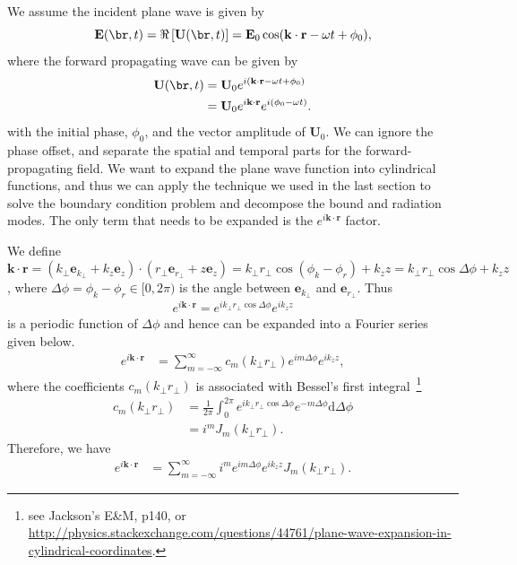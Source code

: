 \documentclass[]{report}
\begin{document}
We assume the incident plane wave is given by
\begin{equation}
\mathbf{E}(\br,t)=\Re\left[\mathbf{U}(\br,t) \right]=\mathbf{E}_0 \cos (\mathbf{k}\cdot\mathbf{r}-\omega t + \phi_0),
\end{equation}
where the forward propagating wave can be given by
\begin{align}
\mathbf{U}(\br,t) &= \mathbf{U}_0e^{i(\mathbf{k}\cdot\mathbf{r}-\omega t + \phi_0)}\\
&= \mathbf{U}_0e^{i\mathbf{k}\cdot\mathbf{r}}e^{i(\phi_0-\omega t )}.
\end{align}
with the initial phase, $\phi_0$, and the vector amplitude of $\mathbf{U}_0$. We can ignore the phase offset, and separate the spatial and temporal parts for the forward-propagating field. We want to expand the plane wave function into cylindrical functions, and thus we can apply the technique we used in the last section to solve the boundary condition problem and decompose the bound and radiation modes. The only term that needs to be expanded is the $ e^{i\mathbf{k}\cdot\mathbf{r}} $ factor. 

We define $ \mathbf{k}\cdot\mathbf{r}=(k\!_{\perp}\mathbf{e}\!_{k\!_\perp}+k_z\mathbf{e}_{z}) \cdot(r\!_{\perp}\mathbf{e}\!_{r\!_\perp}+z\mathbf{e}_{z}) = k\!_{\perp}r\!_{\perp}\cos(\phi_{k}-\phi_{r})+k_{z}{z}= k\!_\perp r\!_\perp \cos \Delta\phi +k_{z}{z}$, where $ \Delta\phi=\phi_{k}-\phi_{r} \in [0,2\pi)$ is the angle between $ \mathbf{e}_{k\!_\perp} $ and $ \mathbf{e}_{r\!_\perp} $. Thus
\begin{align}
e^{i\mathbf{k}\cdot \mathbf{r}}=e^{ik\!_\perp r\!_\perp\cos\Delta\phi}e^{ik_{z}{z}}
\end{align}
is a periodic function of $ \Delta\phi $ and hence can be expanded into a Fourier series given below. 
\begin{align}
e^{i\mathbf{k}\cdot \mathbf{r}} &= \sum_{m=-\infty}^{\infty}c_{m}(k\!_\perp r\!_\perp)e^{im\Delta\phi}e^{ik_{z}{z}},
\end{align}
where the coefficients $ c_{m}(k\!_\perp r\!_\perp) $ is associated with Bessel's first integral~\footnote{see Jackson's E\&M, p140, or \url{http://physics.stackexchange.com/questions/44761/plane-wave-expansion-in-cylindrical-coordinates}.}
\begin{align}
c_{m}(k\!_\perp r\!_\perp)&= \frac{1}{2\pi} \int_0^{2\pi} e^{ik\!_\perp r\!_\perp\cos \Delta\phi}e^{-m\Delta\phi}\mathrm{d}\Delta\phi\\
&=i^mJ_m(k\!_\perp r\!_\perp).
\end{align}
Therefore, we have
\begin{align}
e^{i\mathbf{k}\cdot \mathbf{r}} &=\sum_{m=-\infty}^{\infty}i^me^{im\Delta\phi}e^{ik_{z}{z}}J_m(k\!_\perp r\!_\perp).
\end{align}
\end{document}
